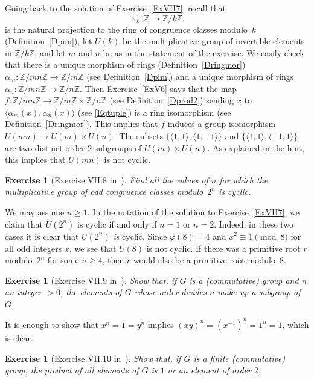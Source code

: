 \documentclass[12pt,letterpaper]{article}
\newcommand{\Z}{\mathbb{Z}}
\newcommand{\Zm}[1]{\Z/#1\Z}
\newtheorem{exer}[thm]{Exercise}
\theoremstyle{definition}
\begin{document}
Going back to the solution of Exercise~\ref{ExVII7}, recall that 
$$
\pi_k:\Z\to\Zm{k}
$$ 
is the natural projection to the ring of congruence classes modulo~$k$ (Definition~\ref{Dpim}), let $U(k)$ be the multiplicative group of invertible elements in $\Zm{k}$, and let $m$ and $n$ be as in the statement of the exercise. We easily check that there is a unique morphism of rings (Definition~\ref{Dringmor}) $\alpha_m:\Zm{mn}\to\Zm{m}$ (see Definition~\ref{Dpim}) and a unique morphism of rings $\alpha_n:\Zm{mn}\to\Zm{n}$. Then Exercise~\ref{ExV6} says that the map $f:\Zm{mn}\to \Zm{m}\times \Zm{n}$ (see Definition~\ref{Dprod2}) sending $x$ to $\langle\alpha_m(x),\alpha_n(x)\rangle$ (see \eqref{Eqtuple}) is a ring isomorphism (see Definition~\ref{Dringmor}). This implies that $f$ induces a group isomorphism $U(mn)\to U(m)\times U(n)$. The subsets $\{\langle1,1\rangle, \langle1,-1\rangle\}$ and $\{\langle1,1\rangle, \langle-1,1\rangle\}$ are two distinct order $2$ subgroups of $U(m)\times U(n)$. As explained in the hint, this implies that $U(mn)$ is not cyclic. 

\begin{exer}[Exercise VII.8 in~\cite{weil1979}]\label{ExVII8}
Find all the values of $n$ for which the multiplicative group of odd congruence classes modulo~$2^n$ is cyclic.
\end{exer}

We may assume $n\ge1$. In the notation of the solution to Exercise~\ref{ExVII7}, we claim that $U(2^n)$ is cyclic if and only if $n=1$ or $n=2$. Indeed, in these two cases it is clear that $U(2^n)$ \emph{is} cyclic. Since $\varphi(8)=4$ and $x^2\equiv1\pmod{8}$ for all odd integers $x$, we see that $U(8)$ is not cyclic. If there was a primitive root $r$ modulo~$2^n$ for some $n\ge4$, then $r$ would also be a primitive root modulo~$8$. 

\begin{exer}[Exercise VII.9 in~\cite{weil1979}]
Show that, if $G$ is a (commutative) group and $n$ an integer $>0$, the elements of $G$ whose order divides $n$ make up a subgroup of $G$.
\end{exer}

It is enough to show that $x^n=1=y^n$ implies $(xy)^n=(x^{-1})^n=1^n=1$, which is clear. 

\begin{exer}[Exercise VII.10 in~\cite{weil1979}]\label{ExVII10}
Show that, if $G$ is a finite (commutative) group, the product of all elements of $G$ is $1$ or an element of order $2$.
\end{exer}
\end{document}
